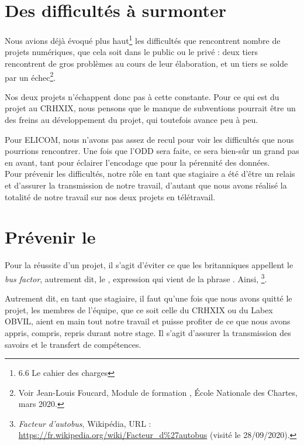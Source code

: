 \section{Des difficultés à surmonter}

Nous avions déjà évoqué plus haut\footnote{6.6 Le cahier des charges} les difficultés que rencontrent nombre de projets numériques, que cela soit dans le public ou le privé : deux tiers rencontrent de gros problèmes au cours de leur élaboration, et un tiers se solde par un échec\footnote{Voir Jean-Louis Foucard, Module de formation  , École Nationale des Chartes, mars 2020.}.

Nos deux projets n'échappent donc pas à cette constante. Pour ce qui est du projet au CRHXIX, nous pensons que le manque de subventions pourrait être un des freins au développement du projet, qui toutefois avance peu à peu. 

Pour ELICOM, nous n'avons pas assez de recul pour voir les difficultés que nous pourrions rencontrer. Une fois que l'ODD sera faite, ce sera bien-sûr un grand pas en avant, tant pour éclairer l'encodage que pour la pérennité des données.\\

Pour prévenir les difficultés, notre rôle en tant que stagiaire a été d'être un relais et d'assurer la transmission de notre travail, d'autant que nous avons réalisé la totalité de notre travail sur nos deux projets en télétravail. 

\section{Prévenir le }

Pour la réussite d'un projet, il s'agit d'éviter ce que les britanniques appellent le \emph{bus factor}, autrement dit, le , expression qui vient de la phrase . Ainsi, \footnote{\emph{Facteur d'autobus}, Wikipédia, URL : \url{https://fr.wikipedia.org/wiki/Facteur_d\%27autobus} (visité le 28/09/2020).}.

Autrement dit, en tant que stagiaire, il faut qu'une fois que nous avons quitté le projet, les membres de l'équipe, que ce soit celle du CRHXIX ou du Labex OBVIL, aient en main tout notre travail et puisse profiter de ce que nous avons appris, compris, repris durant notre stage. Il s'agit d'assurer la transmission des savoirs et le transfert de compétences. 

